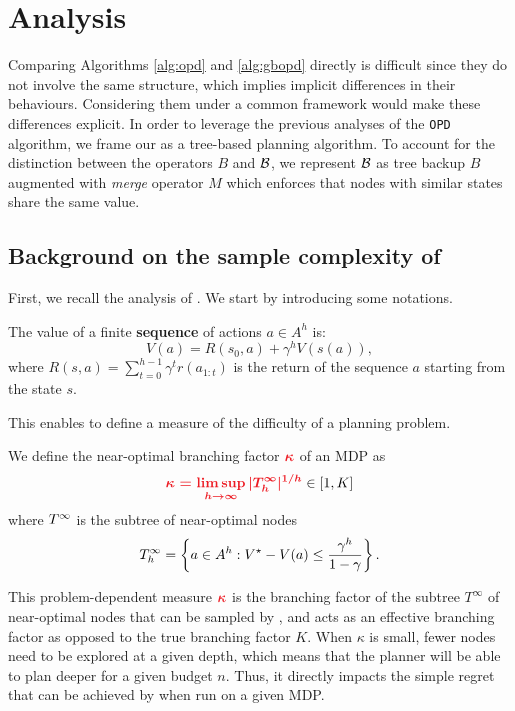 \documentclass[runningheads]{llncs}
\begin{document}
\section{Analysis}
\label{sec:analysis}

Comparing Algorithms \ref{alg:opd} and \ref{alg:gbopd} directly is difficult since they do not involve the same structure, which implies implicit differences in their behaviours. Considering them under a common framework would make these differences explicit. In order to leverage the previous analyses of the \texttt{OPD} algorithm, we frame our  as a tree-based planning algorithm. To account for the distinction between the operators $B$ and $\mathcal{B}$, we represent $\mathcal{B}$ as tree backup $B$ augmented with \emph{merge} operator $M$ which enforces that nodes with similar states share the same value.

\subsection{Background on the sample complexity of \OPD}

First, we recall the analysis of \OPD. We start by introducing some notations.

\begin{definition}
The value of a finite \textbf{sequence} of actions $a\in A^h$ is:
\begin{equation*}
\label{eq:state_value}
    V(a) = R(s_0,a) + \gamma^{h} V(s(a)),
\end{equation*}
where $R(s, a) = \sum_{t=0}^{h-1} \gamma^t r(a_{1:t})$ is the return of the sequence $a$ starting from the state $s$.
\end{definition}

This enables to define a measure of the difficulty of a planning problem.

\begin{definition}
We define the near-optimal branching factor $\hlrb{\kappa}$ of an MDP as
\begin{equation}
\hlrb{\kappa = \limsup_{h\rightarrow\infty} |\hlrb{\Tau_h^\infty}|^{1/h}} \in [1, K]
\end{equation}
where ${T^\infty}$ is the subtree of near-optimal nodes $${T_h^\infty} = \left\{a\in A^h: V^\star-V(a) \leq \frac{\gamma^h}{1-\gamma}\right\}.$$
\end{definition}

This problem-dependent measure $\hlrb{\kappa}$ is the branching factor of the subtree $T^\infty$ of near-optimal nodes that can be sampled by \OPD, and acts as an effective branching factor as opposed to the true branching factor $K$. When $\kappa$ is small, fewer nodes need to be explored at a given depth, which means that the planner will be able to plan deeper for a given budget $n$. Thus, it directly impacts the simple regret that can be achieved by \OPD when run on a given MDP.
\end{document}
